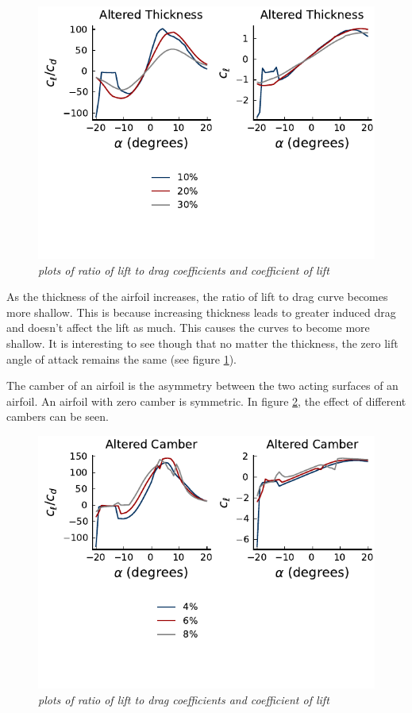 \documentclass{journal}
\begin{document}
	\begin{figure}
		\centering
		\includegraphics{../graphics/altered-thickness.pdf}
		\caption{\emph{plots of ratio of lift to drag coefficients and coefficient of lift}}
		\label{fig:altered-thickness}
	\end{figure}
	
	As the thickness of the airfoil increases, the ratio of lift to drag curve becomes more shallow. This is because increasing thickness leads to greater induced drag and doesn't affect the lift as much. This causes the curves to become more shallow. It is interesting to see though that no matter the thickness, the zero lift angle of attack remains the same (see figure \ref{fig:altered-thickness}).
	
	The camber of an airfoil is the asymmetry between the two acting surfaces of an airfoil. An airfoil with zero camber is symmetric. In figure \ref{fig:altered-camber}, the effect of different cambers can be seen.
	
	\begin{figure}
		\centering
		\includegraphics{../graphics/altered-camber.pdf}
		\caption{\emph{plots of ratio of lift to drag coefficients and coefficient of lift}}
		\label{fig:altered-camber}
	\end{figure}
	
\end{document}
